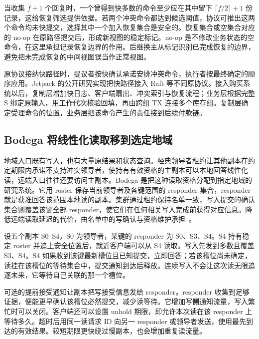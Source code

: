 当收集 $f+1$ 个回复时，一个曾得到快多数的命令至少应在其中留下 $\lceil f/2\rceil+1$ 份记录，这给恢复筛选提供依据。若两个冲突命令都达到候选阈值，协议可推出这两个命令均未快提交，选择其中一个加入恢复集合是安全的。恢复集合或空集合对应的 no-op 在原路径提交后，形成新视图的稳定标记。no-op 是不修改业务状态的空命令，在这里承担记录恢复边界的作用。后继换主从标记识别已完成恢复的边界，避免把未完成恢复的中间视图误当作正常视图。


原协议接纳快路径时，提议者按快确认承诺安排冲突命令，执行者按最终确定的顺序应用。Jetpack 的公开研究实现把快路径接入 Raft 等不同原协议。接入购买系统以后，复制层增加快日志、客户端扇出、冲突索引与恢复流程；业务层根据完整 S 绑定原输入，用工作代次核验回填，再由跨组 TX 连接多个库存组。复制层确定受理命令的位置，业务层把该命令产生的责任接到后续付款链。

\subsection{Bodega 将线性化读取移到选定地域}

地域入口既有写入，也有大量原结果和状态查询。经典领导者租约让其他副本在约定期限内承诺不支持冲突领导者，使持有有效资格的主副本可以本地回答线性化读，远端入口往往还要访问主副本。Bodega 是把这种读取资格分配到指定地域的研究系统。它用 roster 保存当前领导者及各键范围的 responder 集合，responder 就是获准回答该范围本地读的副本。集群通过租约保持名单一致，写入提交的确认集合则覆盖该键全部 responder，使它们在任何相关写入完成前获得对应信息。降低远端读取延迟的代价，由名单中的写确认与资格维护承担~\cite{ch21-bodega}。

设五个副本 S0--S4，S0 为领导者，某键的 responder 为 S0、S3、S4。S4 持有稳定 roster 并追上安全位置后，就近客户端可以从 S4 读取。写入先发到多数且覆盖 S3、S4。S4 如果收到该键最新槽位且已知提交，立即回答；若该槽位尚未确定，读挂在该槽位的等待集合中，提交通知到达后释放。连续写入不会让这次读无限追逐未来，它等待自己关联的那一个槽位。


可选的提前接受通知让副本把写接受信息发给 responder。responder 收集到足够证据，便能更早确认该槽位必然提交，减少读等待。它增加写侧通知流量，写入繁忙时可以关闭。客户端还可以设置 unhold 期限，即允许本次读在该 responder 上等待多久。超时后用同一读请求 ID 向另一 responder 或领导者发送，使用最先到达的有效结果。较短期限更快绕过慢副本，也会增加重复读流量。

